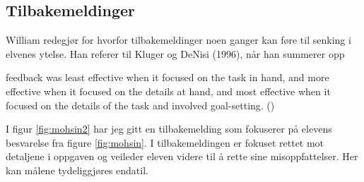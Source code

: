 \documentclass[main.tex]{subfiles}
\begin{document}
\subsection*{Tilbakemeldinger}

William redegjør for hvorfor tilbakemeldinger noen ganger kan føre til senking 
i elvenes ytelse. Han referer til Kluger og DeNisi (1996), når han summerer opp 
\begin{displayquote}
\textelp{} feedback was least effective when it focused on the task in hand, 
and more effective when it focused on the details at hand, and most effective 
when it focused on the details of the task and involved goal-setting.
()
\end{displayquote}



I figur \ref{fig:mohsin2} har jeg gitt en tilbakemelding som fokuserer på
elevens besvarelse fra figure \ref{fig:mohsin}. I tilbakemeldingen er fokuset
rettet mot detaljene i oppgaven og veileder eleven videre til å rette sine
misoppfattelser. Her kan målene tydeliggjøres endatil.
\end{document}
